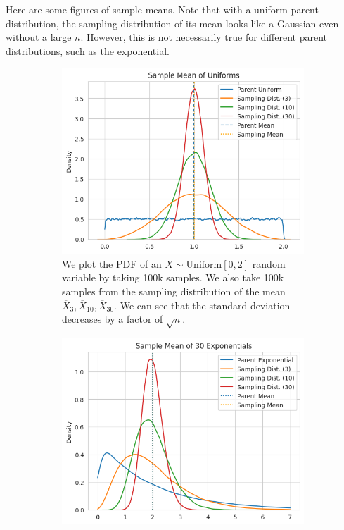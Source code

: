   \begin{example}
    Here are some figures of sample means. Note that with a uniform parent distribution, the sampling distribution of its mean looks like a Gaussian even without a large $n$. However, this is not necessarily true for different parent distributions, such as the exponential. 
    \begin{figure}[H]
      \centering
      \begin{subfigure}[b]{0.48\textwidth}
      \centering
        \includegraphics[width=\textwidth]{img/sample_mean_uniform.png}
        \caption{We plot the PDF of an $X \sim \mathrm{Uniform}[0, 2]$ random variable by taking 100k samples. We also take 100k samples from the sampling distribution of the mean $\overline{X}_{3}, \overline{X}_{10}, \overline{X}_{30}$. We can see that the standard deviation decreases by a factor of $\sqrt{n}$.}
        \label{fig:sample_mean_uniform}
      \end{subfigure}
      \hfill 
      \begin{subfigure}[b]{0.48\textwidth}
      \centering
        \includegraphics[width=\textwidth]{img/sample_mean_exp.png}

\end{subfigure}
\end{figure}
\end{example}
